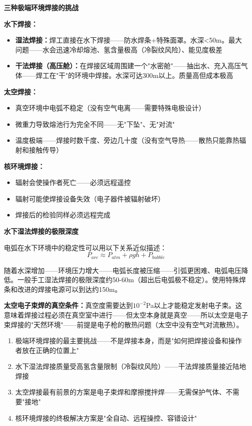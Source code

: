 \documentclass[a4paper,11pt]{ctexbook}
\newenvironment{qualitative}{\vspace{0.3cm}\noindent\begin{tcolorbox}[colback=themeblue!5!white,colframe=themeblue!60!black,title=\textcolor{themeblue}{\textbf{定性分析}}]\vspace{0.1cm}}{\end{tcolorbox}\vspace{0.3cm}}
\newenvironment{quantitative}{\vspace{0.3cm}\noindent\begin{tcolorbox}[colback=quant!5!white,colframe=quant!60!black,title=\textcolor{quant}{\textbf{定量分析}}]\vspace{0.1cm}}{\end{tcolorbox}\vspace{0.3cm}}
\newenvironment{lessonsummary}{\vspace{0.3cm}\noindent\begin{tcolorbox}[colback=summarybg,colframe=green!50!black,title=\textbf{总结}]\vspace{0.1cm}}{\end{tcolorbox}\vspace{0.3cm}}
\begin{document}
\begin{qualitative}
\textbf{三种极端环境焊接的挑战}

\textbf{水下焊接：}
\begin{itemize}
  \item \textbf{湿法焊接：}焊工直接在水下焊接——防水焊条+特殊面罩。水深<50m。最大问题——水会迅速冷却熔池、氢含量极高（冷裂纹风险）、能见度极差
  \item \textbf{干法焊接（高压舱）：}在焊接区域周围建一个"水密舱"——抽出水、充入高压气体——焊工在"干"的环境中焊接。水深可达300m以上。质量高但成本极高
\end{itemize}

\textbf{太空焊接：}
\begin{itemize}
  \item 真空环境中电弧不稳定（没有空气电离——需要特殊电极设计）
  \item 微重力导致熔池行为完全不同——无"下坠"、无"对流"
  \item 温度极端——焊接时数千度、旁边几十度（没有空气导热——散热只能靠热辐射和接触传导）
\end{itemize}

\textbf{核环境焊接：}
\begin{itemize}
  \item 辐射会使操作者死亡——必须远程遥控
  \item 辐射可能使焊接设备失效（电子器件被辐射破坏）
  \item 焊接后的检验同样必须远程完成
\end{itemize}
\end{qualitative}

\begin{quantitative}
\textbf{水下湿法焊接的极限深度}

电弧在水下环境中的稳定性可以用以下关系近似描述：
\[
P_{arc} \approx P_{atm} + \rho g h + P_{bubble}
\]

随着水深增加——环境压力增大——电弧长度被压缩——引弧更困难、电弧电压降低。一般手工湿法焊接的极限深度约50-60m（超出后电弧极不稳定）。使用特殊焊条和改进的焊接电源可以到达约150m。

\textbf{太空电子束焊的真空条件：}真空度需要达到$10^{-2}$Pa以上才能稳定发射电子束。这意味着焊接过程必须在真空室中进行——但太空本身就是真空——所以太空是电子束焊接的"天然环境"——前提是电子枪的散热问题（太空中没有空气对流散热）。
\end{quantitative}

\begin{lessonsummary}
\begin{enumerate}
  \item 极端环境焊接的最主要挑战——不是焊接本身，而是"如何把焊接设备和操作者放在正确的位置上"
  \item 水下湿法焊接质量受高氢含量限制（冷裂纹风险）——干法焊接质量接近陆地焊接
  \item 太空焊接最有前景的方案是电子束焊和摩擦搅拌焊——无需保护气体、不需要"接地"
  \item 核环境焊接的终极解决方案是"全自动、远程操控、容错设计"
\end{enumerate}
\end{lessonsummary}
\end{document}
